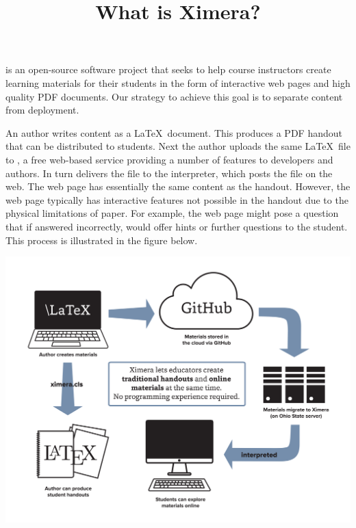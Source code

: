 \documentclass{ximera}
\title{What is Ximera?}
\begin{document}
\maketitle

 is an open-source software project that seeks to help course instructors create learning materials for their students in the form of interactive web pages and high quality PDF documents.
Our strategy to achieve this goal is to separate content from deployment.

An author writes content as a \LaTeX\ document.
This produces a PDF handout that can be distributed to students.
Next the author uploads the same \LaTeX\ file to ,
a free web-based service providing a number of features to developers and authors.
In turn  delivers the file to the  interpreter, which posts the file on the web.
The web page has essentially the same content as the handout.
However, the web page typically has interactive features not possible in the handout due to the physical limitations of paper.
For example, the web page might pose a question that if answered incorrectly, would offer hints or further questions
to the student.
This process is illustrated in the figure below.

\begin{center}
\includegraphics[scale=.25]{XimeraGraphic.png}
\end{center}
\end{document}
